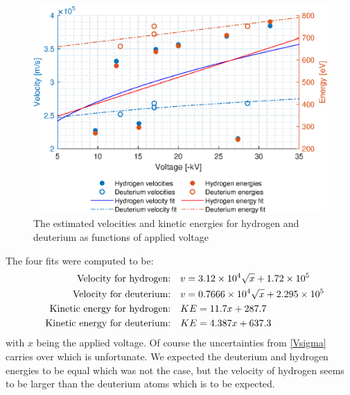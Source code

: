 \begin{figure}
	\centering
	\includegraphics[width=.7\textwidth]{MatlabFigures/Asign3/KineticVelo.eps}
	\caption{The estimated velocities and kinetic energies for hydrogen and deuterium as functions of applied voltage}
	\label{MF}
\end{figure}
The four fits were computed to be:
\begin{align}
	\qq{Velocity for hydrogen:}        & v = 3.12\times10^4 \sqrt{x}+1.72\times10^5   \\
	\qq{Velocity for deuterium:}       & v = 0.7666\times10^4\sqrt{x}+2.295\times10^5 \\
	\qq{Kinetic energy for hydrogen:}  & KE = 11.7x+287.7                             \\
	\qq{Kinetic energy for deuterium:} & KE = 4.387x+637.3
\end{align}
with \(x\) being the applied voltage. Of course the uncertainties from \cref{Vsigma} carries over which is unfortunate. We expected the deuterium and hydrogen energies to be equal which was not the case, but the velocity of hydrogen seems to be larger than the deuterium atoms which is to be expected.
